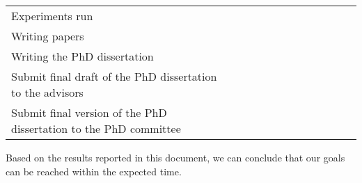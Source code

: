 \documentclass[authoryear,11pt]{elsarticle}
\begin{document}
\begin{table}[h!]
\begin{tabular}{|p{7cm}|c|c|c|c|c|c|c|c|c|c|c|c|}
		\cellcolor{blue}&&\cellcolor{blue}&\cellcolor{blue}&&&&\\
		\hline
		Experiments run &&&\cellcolor{blue}&\cellcolor{blue}&&\cellcolor{blue}&\cellcolor{blue}&&
		\cellcolor{blue}&&&\\
		\hline
		Writing papers &\cellcolor{blue}&&\cellcolor{blue}&&\cellcolor{blue}&\cellcolor{blue}&&&
		\cellcolor{blue}&&&\\
		\hline
		Writing the PhD dissertation &&&&\cellcolor{blue}&\cellcolor{blue}&\cellcolor{blue}&
		\cellcolor{blue}&\cellcolor{blue}&\cellcolor{blue}&&&\\
		\hline
		Submit final draft of the PhD dissertation to the advisors &&&&&&&&&&\cellcolor[gray]{0.9}&&\\
		\hline
		Submit final version of the PhD dissertation to the PhD committee &&&&&&&&&&&\cellcolor[gray]{0.9}&\\
		\hline
		
 	\end{tabular}             
 \end{table}
 
   Based on the results reported in this document, we can conclude that our goals can be reached within the expected time.
	  	


	

{}

\end{document}
